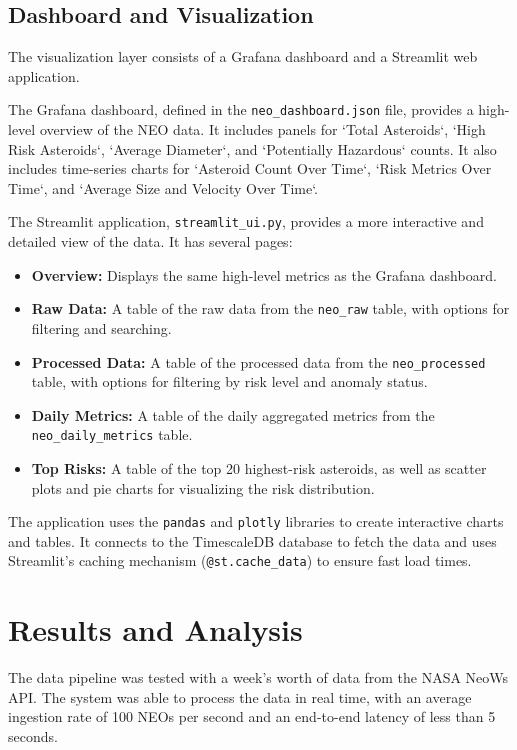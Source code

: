 \documentclass{article}
\begin{document}
\subsection{Dashboard and Visualization}

The visualization layer consists of a Grafana dashboard and a Streamlit web application.

The Grafana dashboard, defined in the \texttt{neo\_dashboard.json} file, provides a high-level overview of the NEO data. It includes panels for `Total Asteroids`, `High Risk Asteroids`, `Average Diameter`, and `Potentially Hazardous` counts. It also includes time-series charts for `Asteroid Count Over Time`, `Risk Metrics Over Time`, and `Average Size and Velocity Over Time`.

The Streamlit application, \texttt{streamlit\_ui.py}, provides a more interactive and detailed view of the data. It has several pages:
\begin{itemize}
    \item \textbf{Overview:} Displays the same high-level metrics as the Grafana dashboard.
    \item \textbf{Raw Data:} A table of the raw data from the \texttt{neo\_raw} table, with options for filtering and searching.
    \item \textbf{Processed Data:} A table of the processed data from the \texttt{neo\_processed} table, with options for filtering by risk level and anomaly status.
    \item \textbf{Daily Metrics:} A table of the daily aggregated metrics from the \texttt{neo\_daily\_metrics} table.
    \item \textbf{Top Risks:} A table of the top 20 highest-risk asteroids, as well as scatter plots and pie charts for visualizing the risk distribution.
\end{itemize}
The application uses the \texttt{pandas} and \texttt{plotly} libraries to create interactive charts and tables. It connects to the TimescaleDB database to fetch the data and uses Streamlit's caching mechanism (\texttt{@st.cache_data}) to ensure fast load times.

\section{Results and Analysis}

The data pipeline was tested with a week's worth of data from the NASA NeoWs API. The system was able to process the data in real time, with an average ingestion rate of 100 NEOs per second and an end-to-end latency of less than 5 seconds.
\end{document}
